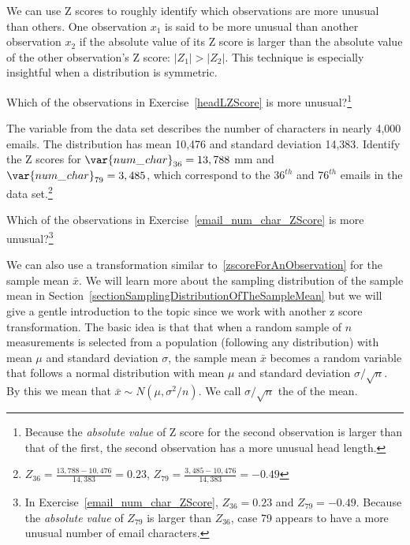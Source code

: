 We can use Z scores to roughly identify which observations are more unusual than others. One observation $x_1$ is said to be more unusual than another observation $x_2$ if the absolute value of its Z score is larger than the absolute value of the other observation's Z score: $|Z_1| > |Z_2|$. This technique is especially insightful when a distribution is symmetric.

\begin{exercise}
Which of the observations in Exercise~\ref{headLZScore} is more unusual?\footnote{Because the \emph{absolute value} of Z score for the second observation is larger than that of the first, the second observation has a more unusual head length.}
\end{exercise}


\begin{exercise} \label{email_num_char_ZScore}
The variable  from the  data set describes the number of characters in nearly 4,000 emails. The distribution has mean 10,476 and standard deviation 14,383. Identify the Z scores for $\var{num\_\hspace{0.3mm}char}_{36}=13,788$ mm and $\var{num\_\hspace{0.3mm}char}_{79}=3,485$, which correspond to the $36^{th}$ and $76^{th}$ emails in the data set.\footnote{$Z_{36} = \frac{13,788 - 10,476}{14,383} = 0.23$, $Z_{79} = \frac{3,485 - 10,476}{14,383} = -0.49$}
\end{exercise}

\begin{exercise}
Which of the observations in Exercise~\ref{email_num_char_ZScore} is more unusual?\footnote{In Exercise~\ref{email_num_char_ZScore}, $Z_{36} = 0.23$ and $Z_{79}=-0.49$. Because the \emph{absolute value} of $Z_{79}$ is larger than $Z_{36}$, case 79 appears to have a more unusual number of email characters.}
\end{exercise}











We can also use a transformation similar to~\ref{zscoreForAnObservation} for the
sample mean $\bar{x}$.
We will learn more about the sampling distribution of the sample mean in
Section~\ref{sectionSamplingDistributionOfTheSampleMean}
but we will give a gentle introduction to the topic since we work with another z score transformation.
The basic idea is that that when a random sample of $n$ measurements is selected from a 
population (following any distribution) with mean $\mu$ and standard deviation $\sigma$, the sample mean $\bar{x}$ becomes a random variable that follows a normal distribution
with mean $\mu$ and standard deviation $\sigma/\sqrt{n}$.
By this we mean that $\bar{x} \sim N(\mu, \sigma^{2}/n)$.
We call $\sigma/\sqrt{n}$ the  of the mean.

